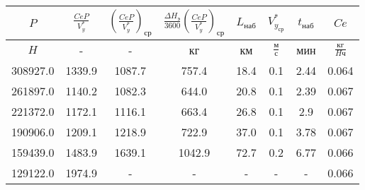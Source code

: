 \begin{tabular}{|c|c|c|c|c|c|c|c|}
\hline
$P$ & $\frac{CeP}{V_y^*}$ & $(\frac{CeP}{V_y^*})_{ср}$ & $\frac{\Delta H_э}{3600}(\frac{CeP}{V_y^*})_{ср}$ & $L_{наб}$ & $V_{y_{ср}}^*$ & $t_{наб}$ & $Ce$ \\ 
\hline
$H$ & - & - & кг & км & $\frac{м}{с}$ & мин & $\frac{кг}{H ч}$ \\ 
\hline
308927.0 & 1339.9 & 1087.7 & 757.4 & 18.4 & 0.1 & 2.44 & 0.064 \\ 
\hline
261897.0 & 1140.2 & 1082.3 & 644.0 & 20.8 & 0.1 & 2.39 & 0.067 \\ 
\hline
221372.0 & 1172.1 & 1116.1 & 663.4 & 26.8 & 0.1 & 2.9 & 0.067 \\ 
\hline
190906.0 & 1209.1 & 1218.9 & 722.9 & 37.0 & 0.1 & 3.78 & 0.067 \\ 
\hline
159439.0 & 1483.9 & 1639.1 & 1042.9 & 72.7 & 0.2 & 6.77 & 0.066 \\ 
\hline
129122.0 & 1974.9 & - & - & - & - & - & 0.066 \\ 
\hline
\end{tabular}
